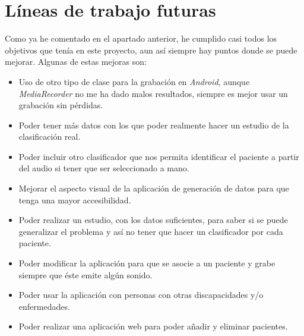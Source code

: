 \section{Líneas de trabajo futuras}
Como ya he comentado en el apartado anterior, he cumplido casi todos los objetivos que tenía en este proyecto, aun así siempre hay puntos donde se puede mejorar. Algunas de estas mejoras son:
\begin{itemize}
	\item Uso de otro tipo de clase para la grabación en \textit{Android}, aunque \textit{MediaRecorder} no me ha dado malos resultados, siempre es mejor usar un grabación sin pérdidas.
	\item Poder tener más datos con los que poder realmente hacer un estudio de la clasificación real.
	\item Poder incluir otro clasificador que nos permita identificar el paciente a partir del audio si tener que ser seleccionado a mano.
	\item Mejorar el aspecto visual de la aplicación de generación de datos para que tenga una mayor accesibilidad.
	\item Poder realizar un estudio, con los datos suficientes, para saber si se puede generalizar el problema y así no tener que hacer un clasificador por cada paciente.
	\item Poder modificar la aplicación para que se asocie a un paciente y grabe siempre que éste emite algún sonido. 
	\item Poder usar la aplicación con personas con otras discapacidades y/o enfermedades.
	\item Poder realizar una aplicación web para poder añadir y eliminar pacientes.
\end{itemize}


